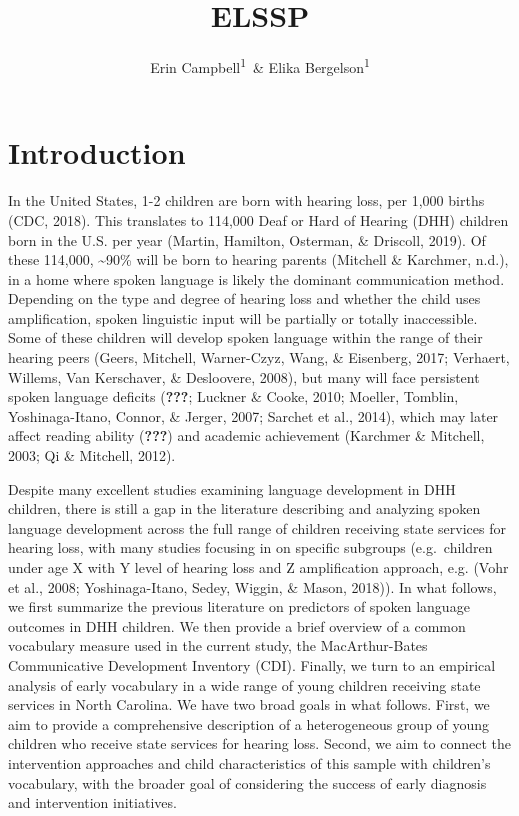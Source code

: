 \documentclass[english,man,floatsintext]{apa6}
\author{Erin Campbell\textsuperscript{1}\ \& Elika Bergelson\textsuperscript{1}}
\affiliation{
\vspace{0.5cm}
\textsuperscript{1} Duke University}
\title{ELSSP}
\date{}
\begin{document}
\maketitle

\hypertarget{introduction}{%
\section{Introduction}\label{introduction}}

In the United States, 1-2 children are born with hearing loss, per 1,000 births (CDC, 2018). This translates to 114,000 Deaf or Hard of Hearing (DHH) children born in the U.S. per year (Martin, Hamilton, Osterman, \& Driscoll, 2019). Of these 114,000, \textasciitilde{}90\% will be born to hearing parents (Mitchell \& Karchmer, n.d.), in a home where spoken language is likely the dominant communication method. Depending on the type and degree of hearing loss and whether the child uses amplification, spoken linguistic input will be partially or totally inaccessible. Some of these children will develop spoken language within the range of their hearing peers (Geers, Mitchell, Warner-Czyz, Wang, \& Eisenberg, 2017; Verhaert, Willems, Van Kerschaver, \& Desloovere, 2008), but many will face persistent spoken language deficits ({\textbf{???}}; Luckner \& Cooke, 2010; Moeller, Tomblin, Yoshinaga-Itano, Connor, \& Jerger, 2007; Sarchet et al., 2014), which may later affect reading ability ({\textbf{???}}) and academic achievement (Karchmer \& Mitchell, 2003; Qi \& Mitchell, 2012).

Despite many excellent studies examining language development in DHH children, there is still a gap in the literature describing and analyzing spoken language development across the full range of children receiving state services for hearing loss, with many studies focusing in on specific subgroups (e.g.~children under age X with Y level of hearing loss and Z amplification approach, e.g. (Vohr et al., 2008; Yoshinaga-Itano, Sedey, Wiggin, \& Mason, 2018)). In what follows, we first summarize the previous literature on predictors of spoken language outcomes in DHH children. We then provide a brief overview of a common vocabulary measure used in the current study, the MacArthur-Bates Communicative Development Inventory (CDI). Finally, we turn to an empirical analysis of early vocabulary in a wide range of young children receiving state services in North Carolina. We have two broad goals in what follows. First, we aim to provide a comprehensive description of a heterogeneous group of young children who receive state services for hearing loss. Second, we aim to connect the intervention approaches and child characteristics of this sample with children's vocabulary, with the broader goal of considering the success of early diagnosis and intervention initiatives.
\end{document}
